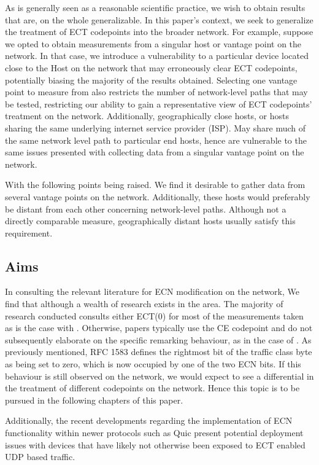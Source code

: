 \documentclass{l4proj}
\begin{document}
As is generally seen as a reasonable scientific practice, we wish to obtain results that are, on the whole generalizable. In this paper's context, we seek to generalize the treatment of ECT codepoints into the broader network. For example, suppose we opted to obtain measurements from a singular host or vantage point on the network. In that case, we introduce a vulnerability to a particular device located close to the Host on the network that may erroneously clear ECT codepoints, potentially biasing the majority of the results obtained. Selecting one vantage point to measure from also restricts the number of network-level paths that may be tested, restricting our ability to gain a representative view of ECT codepoints' treatment on the network. Additionally, geographically close hosts, or hosts sharing the same underlying internet service provider (ISP). May share much of the same network level path to particular end hosts, hence are vulnerable to the same issues presented with collecting data from a singular vantage point on the network. 

With the following points being raised. We find it desirable to gather data from several vantage points on the network. Additionally, these hosts would preferably be distant from each other concerning network-level paths. Although not a directly comparable measure, geographically distant hosts usually satisfy this requirement.

\subsection{Aims}
\label{sec:aims}

In consulting the relevant literature for ECN modification on the network, We find that although a wealth of research exists in the area. The majority of research conducted consults either ECT(0) for most of the measurements taken as is the case with \cite{mcquistin_is_2015}. Otherwise, papers typically use the CE codepoint and do not subsequently elaborate on the specific remarking behaviour, as in the case of \cite{bauer_measuring_2011}. As previously mentioned, RFC 1583 defines the rightmost bit of the traffic class byte as being set to zero, which is now occupied by one of the two ECN bits. If this behaviour is still observed on the network, we would expect to see a differential in the treatment of different codepoints on the network. Hence this topic is to be pursued in the following chapters of this paper. 

Additionally, the recent developments regarding the implementation of ECN functionality within newer protocols such as Quic present potential deployment issues with devices that have likely not otherwise been exposed to ECT enabled UDP based traffic. 
\end{document}
